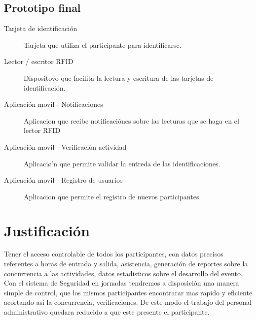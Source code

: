 \documentclass[letter,12pt]{article}
\begin{document}
	\subsection{Prototipo final}		
	
	\begin{description}
		\item[Tarjeta de identificaci\'on] Tarjeta que utiliza el participante para identificarse.
		\item[Lector / escritor RFID] Dispositovo que facilita la lectura y escritura de las tarjetas de identificaci\'on.
		\item[Aplicaci\'on movil - Notificaciones] Aplicacion que recibe notificaci\'ones sobre las lecturas que se haga en el lector RFID
		\item[Aplicaci\'on movil - Verificaci\'on actividad] Aplicaci\o'n que permite validar la entreda de las identificaciones.
		\item[Aplicaci\'on movil - Registro de usuarios] Aplicacion que permite el registro de nuevos participantes.
	\end{description}		
	
\section{Justificaci\'on}

Tener el acceso controlable de todos los participantes, con datos precisos referentes a horas de entrada y salida, asistencia, generaci\'on de reportes sobre la concurrencia a las actividades, datos estadisticos sobre el desarrollo del evento.\\

Con el sistema de Seguridad en jornadas tendremos a disposici\'on una manera simple de control, que los mismos participantes encontrarar mas rapido y eficiente acortando asi la concurrencia, verificaciones. De este modo el trabajo del personal administrativo quedara reducido a que este presente el participante.
\end{document}

